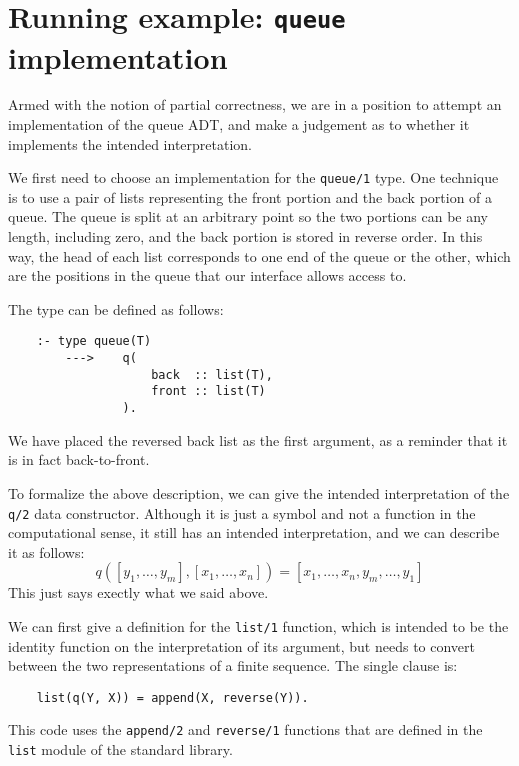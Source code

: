 \section{Running example: \texttt{queue} implementation}
\label{sec:queue-impl}

Armed with the notion of partial correctness,
we are in a position to attempt
an implementation of the queue ADT,
and make a judgement as to
whether it implements the intended interpretation.

We first need to choose an implementation for the \texttt{queue/1} type.
One technique is to use a pair of lists
representing the front portion and the back portion of a queue.
The queue is split at an arbitrary point
so the two portions can be any length, including zero,
and the back portion is stored in reverse order.
In this way,
the head of each list corresponds to
one end of the queue or the other,
which are the positions in the queue
that our interface allows access to.

The type can be defined as follows:
\begin{verbatim}
    :- type queue(T)
        --->    q(
                    back  :: list(T),
                    front :: list(T)
                ).
\end{verbatim}
We have placed the reversed back list as the first argument,
as a reminder that it is in fact back-to-front.


To formalize the above description,
we can give the intended interpretation of the \texttt{q/2}
data constructor.
Although it is just a symbol
and not a function in the computational sense,
it still has an intended interpretation,
and we can describe it as follows:
\[
    q([y_1, \ldots, y_m], [x_1, \ldots, x_n]) =
        [x_1, \ldots, x_n, y_m, \ldots, y_1]
\]
This just says exectly what we said above.

We can first give a definition for the \texttt{list/1} function,
which is intended to be the identity function
on the interpretation of its argument,
but needs to convert between the two representations
of a finite sequence.
The single clause is:
\begin{verbatim}
    list(q(Y, X)) = append(X, reverse(Y)).
\end{verbatim}
This code uses
the \texttt{append/2} and \texttt{reverse/1} functions
that are defined in the \texttt{list} module
of the standard library.

